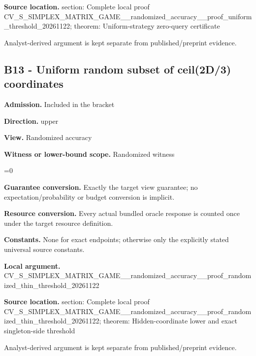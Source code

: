 \documentclass[10pt,a4paper]{article}
\newcommand{\AtlasMath}[1]{\par\begingroup\centering\setbox0=\hbox{$\displaystyle #1$}\ifdim\wd0>1.4\linewidth\typeout{ATLAS WIDE FORMULA: \the\wd0}\fi\ifdim\wd0>\linewidth\resizebox{\linewidth}{!}{\box0}\else\box0\fi\par\endgroup}
\begin{document}
\textbf{Source location.}  section: Complete local proof CV\_S\_SIMPLEX\_MATRIX\_GAME\allowbreak{}\_\_randomized\_accuracy\_\_p\allowbreak{}roof\_uniform\_threshold\_2\allowbreak{}0261122; theorem: Uniform-strategy zero-query certificate



Analyst-derived argument is kept separate from published/preprint evidence.



\subsection{B13 - Uniform random subset of ceil(2D/3) coordinates}


\textbf{Admission.} Included in the bracket



\textbf{Direction.} upper



\textbf{View.} Randomized accuracy



\textbf{Witness or lower-bound scope.} Randomized witness



\AtlasMath{0}


\textbf{Guarantee conversion.} Exactly the target view guarantee; no expectation/probability or budget conversion is implicit.



\textbf{Resource conversion.} Every actual bundled oracle response is counted once under the target resource definition.



\textbf{Constants.} None for exact endpoints; otherwise only the explicitly stated universal source constants.



\textbf{Local argument.} CV\_S\_SIMPLEX\_MATRIX\_GAME\allowbreak{}\_\_randomized\_accuracy\_\_p\allowbreak{}roof\_randomized\_thin\_thr\allowbreak{}eshold\_20261122



\textbf{Source location.}  section: Complete local proof CV\_S\_SIMPLEX\_MATRIX\_GAME\allowbreak{}\_\_randomized\_accuracy\_\_p\allowbreak{}roof\_randomized\_thin\_thr\allowbreak{}eshold\_20261122; theorem: Hidden-coordinate lower and exact singleton-side threshold



Analyst-derived argument is kept separate from published/preprint evidence.
\end{document}
